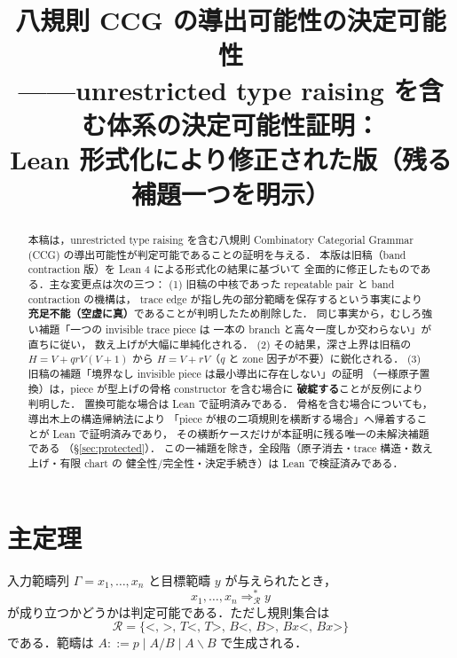 \documentclass[paper=a4,fontsize=10pt,jafontscale=0.92]{jlreq}
\theoremstyle{plain}
\theoremstyle{definition}
\theoremstyle{remark}
\newcommand{\R}{\mathcal{R}}
\newcommand{\bs}{\backslash}
\begin{document}
\title{八規則 CCG の導出可能性の決定可能性\\
  \large ——unrestricted type raising を含む体系の決定可能性証明：\\
  Lean 形式化により修正された版（残る補題一つを明示）}
\author{}
\date{}
\maketitle

\begin{abstract}
本稿は，unrestricted type raising を含む八規則 Combinatory Categorial Grammar
(CCG) の導出可能性が判定可能であることの証明を与える．
本版は旧稿（band contraction 版）を Lean 4 による形式化の結果に基づいて
全面的に修正したものである．主な変更点は次の三つ：
(1) 旧稿の中核であった repeatable pair と band contraction の機構は，
trace edge が指し先の部分範疇を保存するという事実により
\textbf{充足不能（空虚に真）}であることが判明したため削除した．
同じ事実から，むしろ強い補題「一つの invisible trace piece は
一本の branch と高々一度しか交わらない」が直ちに従い，
数え上げが大幅に単純化される．
(2) その結果，深さ上界は旧稿の $H = V + qrV(V+1)$ から
$\boxed{H = V + rV}$（$q$ と zone 因子が不要）に鋭化される．
(3) 旧稿の補題「境界なし invisible piece は最小導出に存在しない」の証明
（一様原子置換）は，piece が型上げの骨格 constructor を含む場合に
\textbf{破綻する}ことが反例により判明した．
置換可能な場合は Lean で証明済みである．
骨格を含む場合についても，導出木上の構造帰納法により
「piece が根の二項規則を横断する場合」へ帰着することが Lean で証明済みであり，
その横断ケースだけが本証明に残る唯一の未解決補題である
（\S\ref{sec:protected}）．
この一補題を除き，全段階（原子消去・trace 構造・数え上げ・有限 chart の
健全性/完全性・決定手続き）は Lean で検証済みである．
\end{abstract}

\tableofcontents

\section*{主定理}

入力範疇列 $\Gamma = x_1, \ldots, x_n$ と目標範疇 $y$ が与えられたとき，
\[
  x_1, \ldots, x_n \Rightarrow_{\R}^{*} y
\]
が成り立つかどうかは判定可能である．ただし規則集合は
\[
  \R = \{{\mathbin{<}},\,{\mathbin{>}},\,T{\mathbin{<}},\,T{\mathbin{>}},\,B{\mathbin{<}},\,B{\mathbin{>}},\,Bx{\mathbin{<}},\,Bx{\mathbin{>}}\}
\]
である．範疇は $A ::= p \mid A/B \mid A\bs B$ で生成される．
\end{document}
